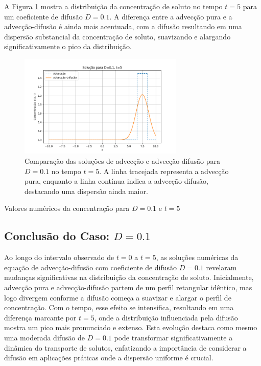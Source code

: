 A Figura \ref{fig:advec_diffus_0.1_t5} mostra a distribuição da concentração de soluto no tempo \( t = 5 \) para um coeficiente de difusão \( D = 0.1 \). A diferença entre a advecção pura e a advecção-difusão é ainda mais acentuada, com a difusão resultando em uma dispersão substancial da concentração de soluto, suavizando e alargando significativamente o pico da distribuição.

\begin{figure}[H]
    \centering
    \includegraphics[width=0.7\textwidth]{code/plot/Advec_Difus_t5_D0.1.png}
    \caption{Comparação das soluções de advecção e advecção-difusão para \( D = 0.1 \) no tempo \( t = 5 \). A linha tracejada representa a advecção pura, enquanto a linha contínua indica a advecção-difusão, destacando uma dispersão ainda maior.}
    \label{fig:advec_diffus_0.1_t5}
\end{figure}

\begin{table}[H]
    \centering
    \caption{Valores numéricos da concentração para \( D = 0.1 \) e \( t = 5 \)}
    
\end{table}


\subsection{Conclusão do Caso: \( D = 0.1 \)}
Ao longo do intervalo observado de \( t = 0 \) a \( t = 5 \), as soluções numéricas da equação de advecção-difusão com coeficiente de difusão \( D = 0.1 \) revelaram mudanças significativas na distribuição da concentração de soluto. Inicialmente, advecção pura e advecção-difusão partem de um perfil retangular idêntico, mas logo divergem conforme a difusão começa a suavizar e alargar o perfil de concentração. Com o tempo, esse efeito se intensifica, resultando em uma diferença marcante por \( t = 5 \), onde a distribuição influenciada pela difusão mostra um pico mais pronunciado e extenso. Esta evolução destaca como mesmo uma moderada difusão de \( D = 0.1 \) pode transformar significativamente a dinâmica do transporte de solutos, enfatizando a importância de considerar a difusão em aplicações práticas onde a dispersão uniforme é crucial.